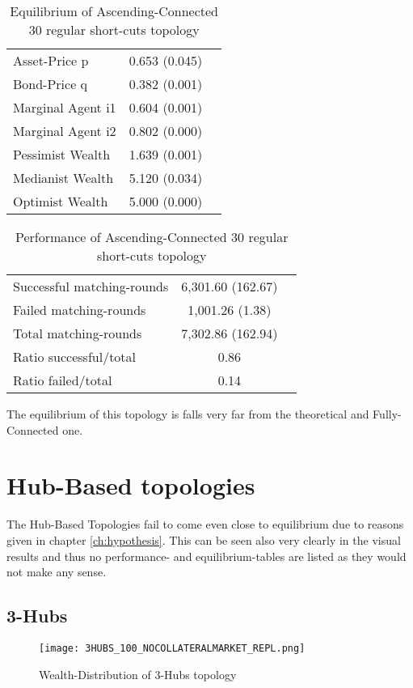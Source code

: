 \documentclass[Bachelorarbeit.tex]{subfiles}
\begin{document}
\begin{table}[H]
	\caption{Equilibrium of Ascending-Connected 30 regular short-cuts topology}
	\centering
	\begin{tabular} { l c r }
		\hline
		Asset-Price p & 0.653 (0.045) \\
		Bond-Price q & 0.382 (0.001) \\
		Marginal Agent i1 & 0.604 (0.001) \\
		Marginal Agent i2 & 0.802 (0.000) \\
		\hline
		Pessimist Wealth & 1.639 (0.001) \\
		Medianist Wealth & 5.120 (0.034) \\
		Optimist Wealth & 5.000 (0.000) \\
		\hline
	\end{tabular}
\end{table} 

\begin{table}[H]
	\caption{Performance of Ascending-Connected 30 regular short-cuts topology}
	\centering
	\begin{tabular} { l c r }
		\hline
		Successful matching-rounds & 6,301.60 (162.67) \\
		Failed matching-rounds & 1,001.26 (1.38) \\
		Total matching-rounds & 7,302.86 (162.94) \\
		\hline
		Ratio successful/total & 0.86 \\
		Ratio failed/total & 0.14 \\
		\hline
	\end{tabular}
\end{table}

The equilibrium of this topology is falls very far from the theoretical and Fully-Connected one.

\section{Hub-Based topologies} 
The Hub-Based Topologies fail to come even close to equilibrium due to reasons given in chapter \ref{ch:hypothesis}. This can be seen also very clearly in the visual results and thus no performance- and equilibrium-tables are listed as they would not make any sense.

\subsection{3-Hubs}
\begin{figure}[H]
	\centering
  \texttt{[image: 3HUBS\_100\_NOCOLLATERALMARKET\_REPL.png]}
	\caption{Wealth-Distribution of 3-Hubs topology}
	\label{fig:wealth_3HUBS_100_NOCOLLATERALMARKET_REPL}
\end{figure}
\end{document}
